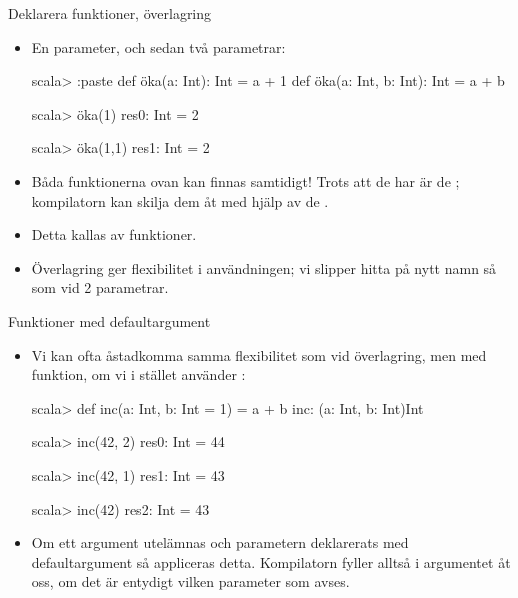 \begin{Slide}{Deklarera funktioner, överlagring}
\begin{itemize}
\item En parameter, och sedan två parametrar:
\begin{REPL}
scala> :paste
  def öka(a: Int): Int = a + 1
  def öka(a: Int, b: Int): Int = a + b

scala> öka(1)
res0: Int = 2

scala> öka(1,1)
res1: Int = 2

\end{REPL}
\item Båda funktionerna ovan kan finnas samtidigt! Trots att de har  är de ; kompilatorn kan skilja dem åt med hjälp av de .

\item Detta kallas   av funktioner.
\item Överlagring ger flexibilitet i användningen; vi slipper hitta på nytt namn så som  vid 2 parametrar.
\end{itemize}
\end{Slide}



\begin{Slide}{Funktioner med defaultargument}\SlideFontSmall

\begin{itemize}
\item Vi kan ofta åstadkomma samma flexibilitet som vid överlagring, men med  funktion, om vi i stället använder :
\begin{REPLnonum}
scala> def inc(a: Int, b: Int = 1) = a + b
inc: (a: Int, b: Int)Int

scala> inc(42, 2)
res0: Int = 44

scala> inc(42, 1)
res1: Int = 43

scala> inc(42)
res2: Int = 43

\end{REPLnonum}
\item Om ett argument utelämnas och parametern deklarerats med defaultargument så appliceras detta. Kompilatorn fyller alltså i argumentet åt oss, om det är entydigt vilken parameter som avses.
\end{itemize}
\end{Slide}


